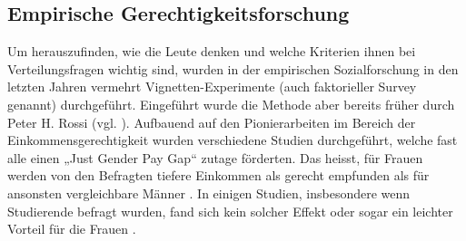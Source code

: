 \documentclass[a4paper,12pt]{article}
\renewcommand{\baselinestretch}{1.1}
\newif\ifcomments
\newcommand{\comment}[1]{%
    \ifcomments\marginpar{\renewcommand{\baselinestretch}{1}\tiny\hspace*{-1.1em}\colorbox{gray!20}%
    {\textcolor{red}{\parbox[t]{.9in}{\raggedright #1}}}}\fi}
\begin{document}
\subsection{Empirische Gerechtigkeitsforschung}
\label{sec:ss4}

Um herauszufinden, wie die Leute denken und welche Kriterien ihnen bei
Verteilungsfragen wichtig sind, wurden in der empirischen Sozialforschung in
den letzten Jahren vermehrt Vignetten-Experimente (auch faktorieller Survey
genannt) durchgeführt. Eingeführt wurde die Methode aber bereits früher durch
Peter H. Rossi (vgl. \citealp{Rossi-1979,Rossi-Nock-1982}). Aufbauend auf den
Pionierarbeiten im Bereich der Einkommensgerechtigkeit
\citep{Jasso-1980,Jasso-Rossi-1977,Jasso-Webster-1997} wurden verschiedene
Studien durchgeführt, welche fast alle einen „Just Gender Pay Gap“ zutage förderten. Das heisst, für Frauen werden von den Befragten tiefere Einkommen als gerecht empfunden als für ansonsten vergleichbare Männer \citep{Jasso-Webster-1997,Jann-2003,Gatskova-2015,Sauer-etal-2009}. In einigen Studien, insbesondere wenn Studierende befragt wurden, fand sich kein solcher Effekt \citep{Auspurg-2009} oder sogar ein leichter Vorteil für die Frauen \citep{Jasso-Webster-1999}. 
\comment{einzelne Experimente ev. noch etwas ausführlicher diskutieren -> ok}
\end{document}
